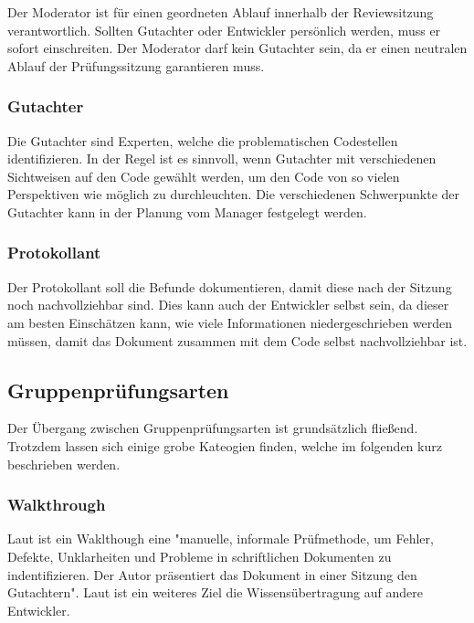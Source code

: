 \documentclass[	%
		fontsize=11pt,  %
		a4paper,	    %
		ngerman,		%
		sans,			%
		f4,				%
	]{HsH-report}		%
\begin{document}
Der Moderator ist für einen geordneten Ablauf innerhalb der Reviewsitzung
verantwortlich. Sollten Gutachter oder Entwickler persönlich werden, muss er
sofort einschreiten. Der Moderator darf kein Gutachter sein, da er einen
neutralen Ablauf der Prüfungssitzung garantieren muss.

\subsubsection{Gutachter}

Die Gutachter sind Experten, welche die problematischen Codestellen
identifizieren. In der Regel ist es sinnvoll, wenn Gutachter mit verschiedenen
Sichtweisen auf den Code gewählt werden, um den Code von so vielen Perspektiven
wie möglich zu durchleuchten. Die verschiedenen Schwerpunkte der Gutachter kann
in der Planung vom Manager festgelegt werden.

\subsubsection{Protokollant}

Der Protokollant soll die Befunde dokumentieren, damit diese nach der Sitzung
noch nachvollziehbar sind. Dies kann auch der Entwickler selbst sein, da dieser
am besten Einschätzen kann, wie viele Informationen niedergeschrieben werden
müssen, damit das Dokument zusammen mit dem Code selbst nachvollziehbar ist.

\subsection{Gruppenprüfungsarten} \label{gruppenprüfungsarten}

Der Übergang zwischen Gruppenprüfungsarten ist grundsätzlich fließend. Trotzdem
lassen sich einige grobe Kateogien finden, welche im folgenden kurz beschrieben
werden.

\subsubsection{Walkthrough}

Laut \textcite{balzert:lehrbuch} ist ein Waklthough eine "manuelle, informale
Prüfmethode, um Fehler, Defekte, Unklarheiten und Probleme in schriftlichen
Dokumenten zu indentifizieren. Der Autor präsentiert das Dokument in einer
Sitzung den Gutachtern". Laut \textcite{ieee:1028} ist ein weiteres Ziel die
Wissensübertragung auf andere Entwickler.
\end{document}
